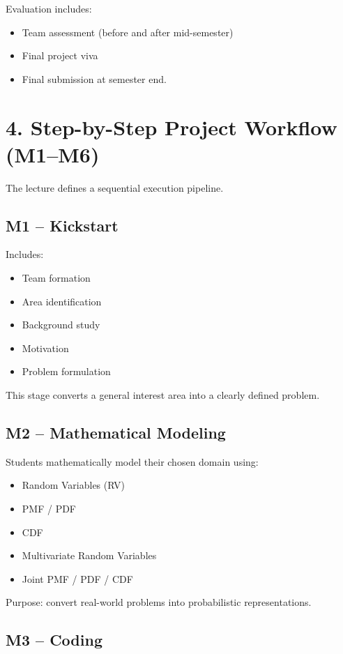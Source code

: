 \documentclass[11pt]{article}
\begin{document}
Evaluation includes:

\begin{itemize}
\item Team assessment (before and after mid-semester)
\item Final project viva
\item Final submission at semester end.
\end{itemize}

\section*{4. Step-by-Step Project Workflow (M1–M6)}

The lecture defines a sequential execution pipeline.

\subsection*{M1 – Kickstart}

Includes:

\begin{itemize}
\item Team formation
\item Area identification
\item Background study
\item Motivation
\item Problem formulation
\end{itemize}

This stage converts a general interest area into a clearly defined problem.

\subsection*{M2 – Mathematical Modeling}

Students mathematically model their chosen domain using:

\begin{itemize}
\item Random Variables (RV)
\item PMF / PDF
\item CDF
\item Multivariate Random Variables
\item Joint PMF / PDF / CDF
\end{itemize}

Purpose: convert real-world problems into probabilistic representations.

\subsection*{M3 – Coding}
\end{document}
